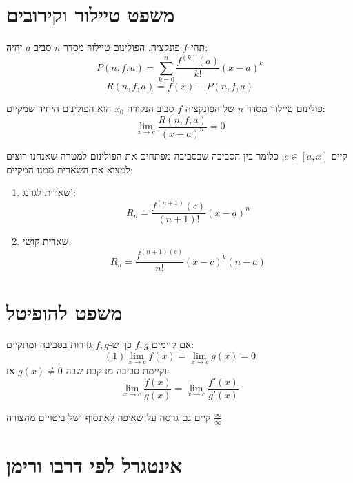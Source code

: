 \documentclass{tstextbook}
\begin{document}
\section{משפט טיילור וקירובים}

\begin{definition}
תהי \(f\) פונקציה. הפולינום טיילור מסדר \(n\) סביב \(a\) יהיה:
$$P(n,f,a)=\sum_{k=0}^n \frac{f^{(k)}(a)}{k!}(x-a)^k$$$$R(n,f,a) = f(x) - P(n, f, a)$$

\end{definition}
\begin{proposition}
פולינום טיילור מסדר \(n\) של הפונקציה \(f\) סביב הנקודה \(x_{0}\) הוא הפולינום היחיד שמקיים:
$$\lim_{x\rightarrow c} \frac{R(n,f,a)}{(x-a)^n} = 0$$

\end{proposition}
\begin{theorem}
קיים \(c\in [a,x]\), כלומר בין הסביבה שבסביבה מפתחים את הפולינום למטרה שאנחנו רוצים למצוא את השארית ממנו המקיים:

\end{theorem}
\begin{enumerate}
  \item שארית לגרנג': 
 $$R_n = \frac{f^{(n+1)}(c)}{(n+1)!}(x-a)^n$$


  \item שארית קושי: 
 $$R_n = \frac{f^{(n+1)(c)}}{n!}(x-c)^k(n-a)$$


\end{enumerate}
\section{משפט להופיטל}

\begin{theorem}[לופיטל]
אם קיימים \(f,g\) כך ש-\(f,g\) גזירות בסביבה ומתקיים:
    $$(1) \lim_{x\to c} f(x) =\lim_{x\to c} g(x) = 0$$
וקיימת סביבה מנוקבת שבה \(g(x)\neq 0\) אז:
    $$\lim_{x\rightarrow c} \frac{f(x)}{g(x)} = \lim_{x\rightarrow c} \frac{f'(x)}{g'(x)}$$

\end{theorem}
\begin{remark}
קיים גם גרסה על שאיפה לאינסוף ושל ביטויים מהצורה \(\frac{\infty}{\infty}\)

\end{remark}

\section{אינטגרל לפי דרבו ורימן}
\end{document}

